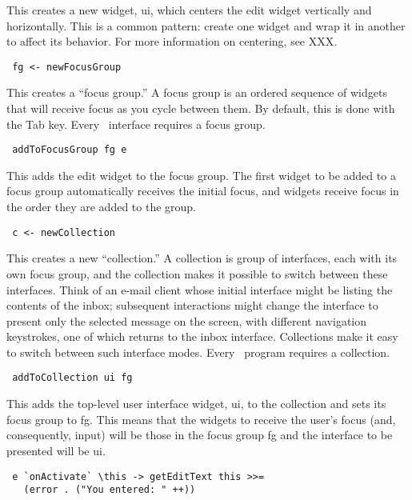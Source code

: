 This creates a new widget, ui, which centers the edit widget vertically
and horizontally.  This is a common pattern: create one widget and wrap
it in another to affect its behavior.  For more information on
centering, see XXX.

\begin{verbatim}
 fg <- newFocusGroup
\end{verbatim}

This creates a “focus group.”  A focus group is an ordered sequence of
widgets that will receive focus as you cycle between them.  By
default, this is done with the Tab key.  Every \vtyui\ interface
requires a focus group.

\begin{verbatim}
 addToFocusGroup fg e
\end{verbatim}

This adds the edit widget to the focus group.  The first widget to be
added to a focus group automatically receives the initial focus, and
widgets receive focus in the order they are added to the group.

\begin{verbatim}
 c <- newCollection
\end{verbatim}

This creates a new “collection.”  A collection is group of interfaces,
each with its own focus group, and the collection makes it possible to
switch between these interfaces.  Think of an e-mail client whose
initial interface might be listing the contents of the inbox;
subsequent interactions might change the interface to present only the
selected message on the screen, with different navigation keystrokes,
one of which returns to the inbox interface.  Collections make it easy
to switch between such interface modes.  Every \vtyui\ program
requires a collection.

\begin{verbatim}
 addToCollection ui fg
\end{verbatim}

This adds the top-level user interface widget, ui, to the collection and
sets its focus group to fg.  This means that the widgets to receive the
user’s focus (and, consequently, input) will be those in the focus group
fg and the interface to be presented will be ui.

\begin{verbatim}
 e `onActivate` \this -> getEditText this >>=
   (error . ("You entered: " ++))
\end{verbatim}


